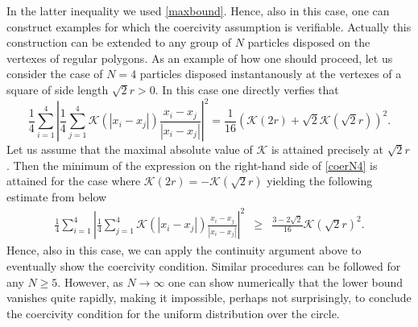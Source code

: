 In the latter inequality we used \eqref{maxbound}. Hence, also in this case, one can construct examples for which the coercivity assumption is verifiable. Actually this construction can be extended to any group of $N$ particles disposed on the vertexes of regular polygons. As an example of how one should proceed, let us consider the case of $N=4$ particles disposed instantanously at the vertexes of a square of side length $\sqrt{2} r>0$. In this case one directly verfies that
\begin{equation}\label{coerN4}
\frac{1}{4} \sum_{i=1}^4 \left | \frac{1}{4} \sum_{j=1}^4 \mathcal K(|x_i-x_j|) \frac{x_i-x_j}{|x_i-x_j|} \right |^2 = \frac{1}{16} ( \mathcal K(2 r) +  \sqrt 2 \mathcal K(\sqrt 2 r) )^2.
\end{equation}
Let us assume that the maximal absolute value of $\mathcal K$ is attained precisely at $\sqrt 2 r$. Then the minimum of the expression on the right-hand side of \eqref{coerN4} is attained for
the case where $\mathcal K(2 r)  = -  \mathcal K(\sqrt 2 r)$ yielding the following estimate from below
\begin{eqnarray*}
\frac{1}{4} \sum_{i=1}^4 \left | \frac{1}{4} \sum_{j=1}^4 \mathcal K(|x_i-x_j|) \frac{x_i-x_j}{|x_i-x_j|} \right |^2  &\geq& \frac{3 -2 \sqrt 2}{16} \mathcal K(\sqrt 2 r)^2.
\end{eqnarray*}
Hence, also in this case, we can apply the continuity argument above to eventually show the coercivity condition. Similar procedures can be followed for any $N \geq 5$. However, as $N \to \infty$ one can show numerically that the lower bound vanishes quite rapidly, making it impossible, perhaps not surprisingly, to conclude the coercivity condition for the uniform distribution over the circle.
\\

